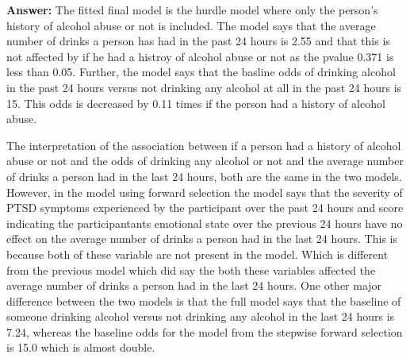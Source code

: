 \documentclass{article}\usepackage[]{graphicx}\usepackage[]{color}
\begin{document}
{\bf Answer: }     The fitted final model is the hurdle model where only the  person's history of alcohol abuse or not is included. The model says that the average number of drinks a person has had in the past 24 hours is 2.55 and that this is not affected by if he had a histroy of alcohol abuse or not as the pvalue 0.371 is less than 0.05. Further, the model says that the basline odds of drinking alcohol in the past 24 hours versus not drinking any alcohol at all in the past 24 hours is 15. This odds is decreased by 0.11 times if the person had a history of alcohol abuse. 

\vspace{5mm}

The interpretation of the association between if a person had a history of alcohol abuse or not and the odds of drinking any alcohol or not and the average number of drinks a person had in the last 24 hours, both are the same in the two models. However, in the model using forward selection the model says that the  severity of PTSD symptoms experienced by the participant over the past 24 hours and  score indicating the participantants emotional state over the previous 24 hours have no effect on the average number of drinks a person had in the last 24 hours. This is because both of these variable are not present in the model. Which is different from the previous model which did say the both these variables affected the average number of drinks a person had in the last 24 hours. One other major difference between the two models is that the full model says that the baseline of someone drinking alcohol versus not drinking any alcohol in the last 24 hours is 7.24, whereas the baseline odds for the model from the stepwise forward selection is 15.0 which is almost double.  
\end{document}
